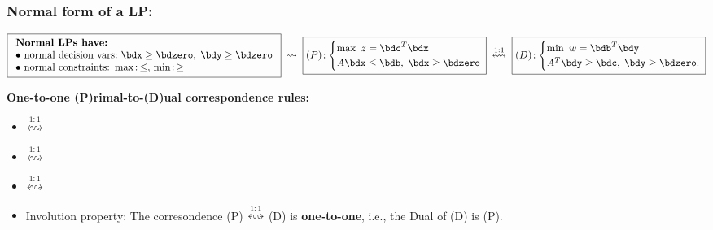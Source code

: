 \documentclass[a4paper]{article}
\begin{document}
\subsubsection*{Normal form of a LP:} %
\(
\boxed{
  \begin{array}[m]{l}
   \textbf{Normal LPs have:}  \\
   \bullet~\mbox{normal decision vars:}~\bdx\ge\bdzero,\;\bdy\ge\bdzero \\
   \bullet~\mbox{normal constraints:}~\max\!:\,\le,\,\min\!:\,\ge \\
  \end{array}
}
\;\rightsquigarrow\;
\boxed{
  (P)\!:
  \begin{cases}
    \max~z=\bdc^T\bdx \cr
    A\bdx\le\bdb,\;  \bdx\ge\bdzero
  \end{cases}
  \mkern-15mu
}
   \;\overset{1:1}\leftrightsquigarrow\;
   \boxed{
     (D)\!:\begin{cases}
       \min~w=\bdb^T\bdy\cr
       A^T\bdy\ge\bdc,\;\bdy\ge\bdzero.
     \end{cases}
  \mkern-15mu
   }
\)%

\bigskip\textbf{One-to-one (P)rimal-to-(D)ual correspondence rules:}%
\begin{itemize}
  \item {} $\overset{1:1}\leftrightsquigarrow$ 
  \item {} $\overset{1:1}\leftrightsquigarrow$
  \item {} $\overset{1:1}\leftrightsquigarrow$
  \item Involution property: The corresondence
      (P) $\overset{1:1}\leftrightsquigarrow$
      (D) is \textbf{one-to-one}, i.e., the Dual of (D) is (P).
\end{itemize}%
\end{document}
